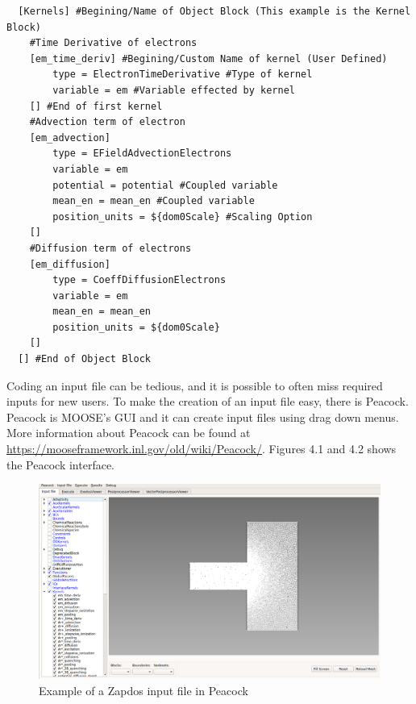 \documentclass[final]{report}
\begin{document}
  \begin{verbatim}
  [Kernels] #Begining/Name of Object Block (This example is the Kernel Block)
    #Time Derivative of electrons
    [em_time_deriv] #Begining/Custom Name of kernel (User Defined)
        type = ElectronTimeDerivative #Type of kernel
        variable = em #Variable effected by kernel
    [] #End of first kernel
    #Advection term of electron
    [em_advection]
        type = EFieldAdvectionElectrons
        variable = em
        potential = potential #Coupled variable
        mean_en = mean_en #Coupled variable
        position_units = ${dom0Scale} #Scaling Option
    []
    #Diffusion term of electrons
    [em_diffusion]
        type = CoeffDiffusionElectrons
        variable = em
        mean_en = mean_en
        position_units = ${dom0Scale}
    []
  [] #End of Object Block
  \end{verbatim}

  Coding an input file can be tedious, and it is possible to often miss required inputs for new users. To make the creation of an input file easy, there is Peacock. Peacock is MOOSE's GUI and it can create input files using drag down menus. More information about Peacock can be found at \\
  \url{https://mooseframework.inl.gov/old/wiki/Peacock/}. Figures 4.1 and 4.2 shows the Peacock interface.


\begin{figure}[h]
  \centering
  \includegraphics[scale=0.35]{zapdos_content/media/Zapdos_Peacock.png}
  \caption{Example of a Zapdos input file in Peacock}
\end{figure}
\end{document}
